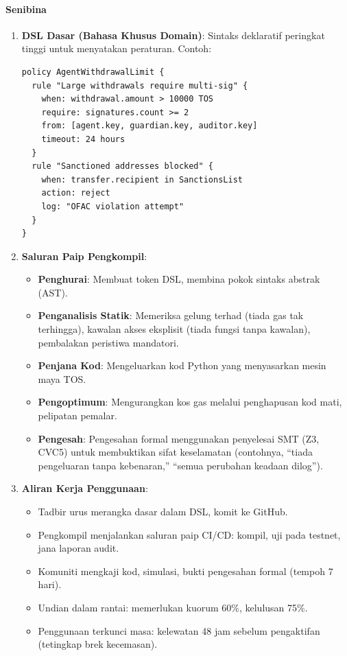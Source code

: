 \documentclass[11pt]{article}
\begin{document}
\paragraph{Senibina}
\begin{enumerate}[noitemsep]
  \item \textbf{DSL Dasar (Bahasa Khusus Domain)}: Sintaks deklaratif peringkat tinggi untuk menyatakan peraturan. Contoh:
  \begin{verbatim}
policy AgentWithdrawalLimit {
  rule "Large withdrawals require multi-sig" {
    when: withdrawal.amount > 10000 TOS
    require: signatures.count >= 2
    from: [agent.key, guardian.key, auditor.key]
    timeout: 24 hours
  }
  rule "Sanctioned addresses blocked" {
    when: transfer.recipient in SanctionsList
    action: reject
    log: "OFAC violation attempt"
  }
}
  \end{verbatim}
  \item \textbf{Saluran Paip Pengkompil}:
    \begin{itemize}[noitemsep]
      \item \textbf{Penghurai}: Membuat token DSL, membina pokok sintaks abstrak (AST).
      \item \textbf{Penganalisis Statik}: Memeriksa gelung terhad (tiada gas tak terhingga), kawalan akses eksplisit (tiada fungsi tanpa kawalan), pembalakan peristiwa mandatori.
      \item \textbf{Penjana Kod}: Mengeluarkan kod Python yang menyasarkan mesin maya TOS.
      \item \textbf{Pengoptimum}: Mengurangkan kos gas melalui penghapusan kod mati, pelipatan pemalar.
      \item \textbf{Pengesah}: Pengesahan formal menggunakan penyelesai SMT (Z3, CVC5) untuk membuktikan sifat keselamatan (contohnya, ``tiada pengeluaran tanpa kebenaran,'' ``semua perubahan keadaan dilog'').
    \end{itemize}
  \item \textbf{Aliran Kerja Penggunaan}:
    \begin{itemize}[noitemsep]
      \item Tadbir urus merangka dasar dalam DSL, komit ke GitHub.
      \item Pengkompil menjalankan saluran paip CI/CD: kompil, uji pada testnet, jana laporan audit.
      \item Komuniti mengkaji kod, simulasi, bukti pengesahan formal (tempoh 7 hari).
      \item Undian dalam rantai: memerlukan kuorum 60\%, kelulusan 75\%.
      \item Penggunaan terkunci masa: kelewatan 48 jam sebelum pengaktifan (tetingkap brek kecemasan).
    \end{itemize}
\end{enumerate}
\end{document}
